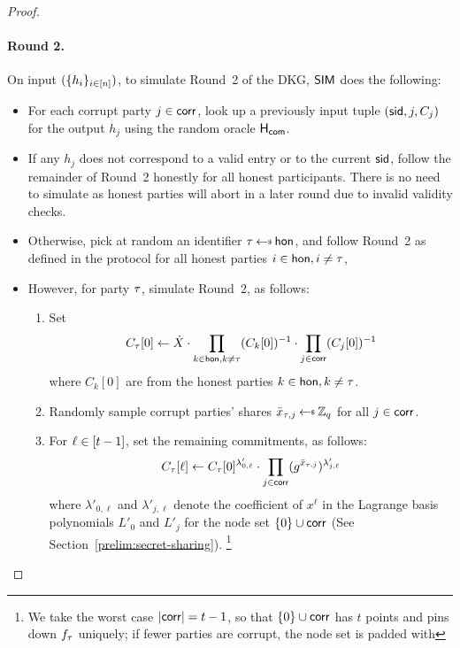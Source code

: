 \begin{proof}
    \paragraph{\bf Round 2.}
    On input $(\{h_i\}_{i\in[n]})$,
    to simulate Round~2 of the DKG,
    $\mathsf{SIM}$ does the following:
    \begin{itemize}
      \item For each corrupt party $j \in \mathsf{corr}$,
      look up a previously input tuple $(\mathsf{sid}, j, C_j)$ for the output $h_j$ using the random oracle $\mathsf{H_{\mathsf{com}}}$.
      \item If any $h_j$ does not correspond to a valid entry or to the current $\mathsf{sid}$,
      follow the remainder of Round~2 honestly for all honest participants.
      There is no need to simulate as honest parties will abort in a later
      round due to invalid validity checks.
      \item Otherwise, pick at random an identifier $\simid \rgets \honest$,
      and follow Round~2 as defined in the protocol
      for all honest parties $i \in \mathsf{hon}, i \neq \tau$,
      \item However, for party $\tau$,
        simulate Round~2,
        as follows:
        \begin{enumerate}
    \item Set
          \begin{equation}
            \label{eq:simid-comm}
C_{\tau}[0] \gets \dot{X} \cdot
              \prod_{k \in \mathsf{hon}, k  \neq \tau} (C_{k}[0])^{-1} \cdot
              \prod_{j \in \mathsf{corr}} (C_{j}[0])^{-1}
          \end{equation}
          where $C_{k}[0]$ are from the honest parties $k \in \mathsf{hon}, k \neq \tau$.
        \item Randomly sample corrupt parties' shares $\share_{\simid,j} \rgets \Zq$ for all $j \in \mathsf{corr}$.
        \item For $\ell \in [t-1]$, set the remaining commitments, as follows:
          \[ C_\tau[\ell] \gets C_\tau[0]^{\lambda'_{0,\ell}} \cdot
            \prod_{j \in \mathsf{corr} } (g^{\bar{x}_{\tau,j}})^{\lambda'_{j,\ell}} \]
        where $\lambda'_{0,\ell}$ and $\lambda'_{j,\ell}$ denote the coefficient of $x^\ell$ in the Lagrange basis
        polynomials $L'_0$ and $L'_j$ for the node set $\{ 0\}\cup\mathsf{corr}$ (See Section~\ref{prelim:secret-sharing}).%
        \footnote{We take the worst case $\lvert\mathsf{corr}\rvert = t-1$, so that $\{0\}\cup\mathsf{corr}$ has $t$
        points and pins down $f_\tau$ uniquely; if fewer parties are corrupt, the node set is padded with
}
\end{enumerate}
\end{itemize}
\end{proof}
